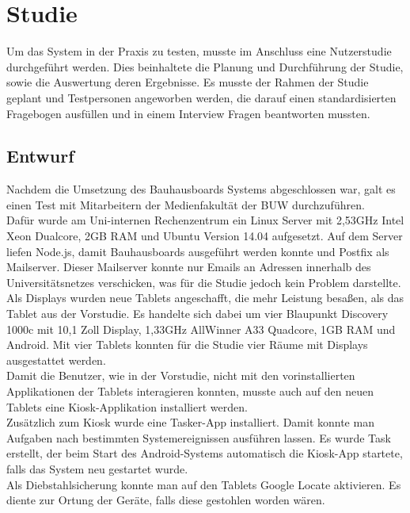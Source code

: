 \chapter{Studie}\label{Studie}
Um das System in der Praxis zu testen, musste im Anschluss eine Nutzerstudie durchgeführt werden.
Dies beinhaltete die Planung und Durchführung der Studie, sowie die Auswertung deren Ergebnisse.
Es musste der Rahmen der Studie geplant und Testpersonen angeworben werden, die darauf einen standardisierten Fragebogen ausfüllen und in einem Interview Fragen beantworten mussten.

\section{Entwurf}\label{Entwurf}
Nachdem die Umsetzung des Bauhausboards Systems abgeschlossen war, galt es einen Test mit Mitarbeitern der Medienfakultät der BUW durchzuführen.
\\
Dafür wurde am Uni-internen Rechenzentrum ein Linux Server mit 2,53GHz Intel Xeon Dualcore, 2GB RAM und Ubuntu Version 14.04 aufgesetzt.
Auf dem Server liefen Node.js, damit Bauhausboards ausgeführt werden konnte und Postfix als Mailserver.
Dieser Mailserver konnte nur Emails an Adressen innerhalb des Universitätsnetzes verschicken, was für die Studie jedoch kein Problem darstellte.
\\
Als Displays wurden neue Tablets angeschafft, die mehr Leistung besaßen, als das Tablet aus der Vorstudie.
Es handelte sich dabei um vier Blaupunkt Discovery 1000c mit 10,1 Zoll Display, 1,33GHz AllWinner A33 Quadcore, 1GB RAM und Android. Mit vier Tablets konnten für die Studie vier Räume mit Displays ausgestattet werden.
\\
Damit die Benutzer, wie in der Vorstudie, nicht mit den vorinstallierten Applikationen der Tablets interagieren konnten, musste auch auf den neuen Tablets eine Kiosk-Applikation installiert werden.
\\
Zusätzlich zum Kiosk wurde eine Tasker-App installiert.
Damit konnte man Aufgaben nach bestimmten Systemereignissen ausführen lassen.
Es wurde Task erstellt, der beim Start des Android-Systems automatisch die Kiosk-App startete, falls das System neu gestartet wurde.
\\
Als Diebstahlsicherung konnte man auf den Tablets Google Locate aktivieren.
Es diente zur Ortung der Geräte, falls diese gestohlen worden wären.
